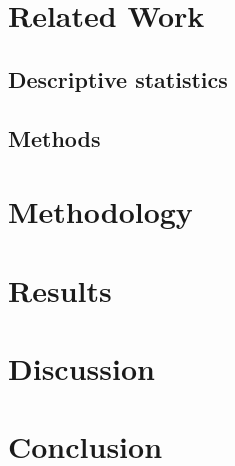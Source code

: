 \documentclass[english, grading]{tktltiki2}
\theoremstyle{definition}
\theoremstyle{remark}
\numberwithin{equation}{section} %
\begin{document}
\newpage

\section{Related Work}


\subsection{Descriptive statistics}


\subsection{Methods}


%


\section{Methodology}


\section{Results}

\section{Discussion}


\section{Conclusion}


%

%
%
%
%
\newpage




\end{document}
